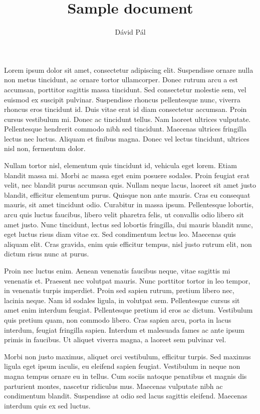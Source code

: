 \documentclass{article}
\begin{document}
\title{Sample document}
\author{D\'avid P\'al}
\maketitle

Lorem ipsum dolor sit amet, consectetur adipiscing elit. Suspendisse ornare
nulla non metus tincidunt, ac ornare tortor ullamcorper. Donec rutrum arcu a est
accumsan, porttitor sagittis massa tincidunt. Sed consectetur molestie sem, vel
euismod ex suscipit pulvinar. Suspendisse rhoncus pellentesque nunc, viverra
rhoncus eros tincidunt id. Duis vitae erat id diam consectetur accumsan. Proin
cursus vestibulum mi. Donec ac tincidunt tellus. Nam laoreet ultrices vulputate.
Pellentesque hendrerit commodo nibh sed tincidunt. Maecenas ultrices fringilla
lectus nec luctus. Aliquam et finibus magna. Donec vel lectus tincidunt,
ultrices nisl non, fermentum dolor.

Nullam tortor nisl, elementum quis tincidunt id, vehicula eget lorem. Etiam
blandit massa mi. Morbi ac massa eget enim posuere sodales. Proin feugiat erat
velit, nec blandit purus accumsan quis. Nullam neque lacus, laoreet sit amet
justo blandit, efficitur elementum purus. Quisque non ante mauris. Cras eu
consequat mauris, sit amet tincidunt odio. Curabitur in massa ipsum.
Pellentesque lobortis, arcu quis luctus faucibus, libero velit pharetra felis,
ut convallis odio libero sit amet justo. Nunc tincidunt, lectus sed lobortis
fringilla, dui mauris blandit nunc, eget luctus risus diam vitae ex. Sed
condimentum lectus leo. Maecenas quis aliquam elit. Cras gravida, enim quis
efficitur tempus, nisl justo rutrum elit, non dictum risus nunc at purus.

Proin nec luctus enim. Aenean venenatis faucibus neque, vitae sagittis mi
venenatis et. Praesent nec volutpat mauris. Nunc porttitor tortor in leo tempor,
in venenatis turpis imperdiet. Proin sed sapien rutrum, pretium libero nec,
lacinia neque. Nam id sodales ligula, in volutpat sem. Pellentesque cursus sit
amet enim interdum feugiat. Pellentesque pretium id eros ac dictum. Vestibulum
quis pretium quam, non commodo libero. Cras sapien arcu, porta in lacus
interdum, feugiat fringilla sapien. Interdum et malesuada fames ac ante ipsum
primis in faucibus. Ut aliquet viverra magna, a laoreet sem pulvinar vel.

Morbi non justo maximus, aliquet orci vestibulum, efficitur turpis. Sed maximus
ligula eget ipsum iaculis, eu eleifend sapien feugiat. Vestibulum in neque non
magna tempus ornare eu in tellus. Cum sociis natoque penatibus et magnis dis
parturient montes, nascetur ridiculus mus. Maecenas vulputate nibh ac
condimentum blandit. Suspendisse at odio sed lacus sagittis eleifend. Maecenas
interdum quis ex sed luctus.
\end{document}
